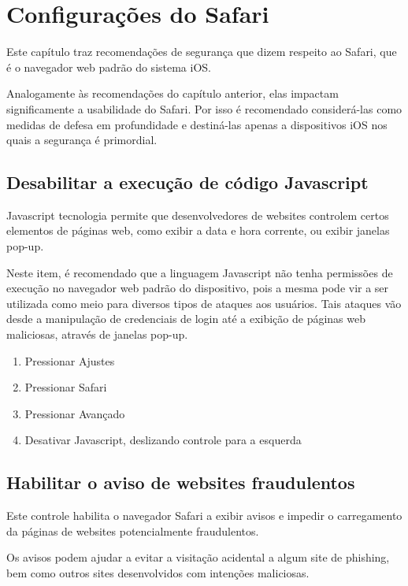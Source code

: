 \chapter{Configura\c c\~oes do Safari}

Este cap\'itulo traz recomenda\c c\~oes de seguran\c ca que dizem respeito ao Safari, que \'e o navegador web padr\~ao do sistema iOS. 

Analogamente \`as recomenda\c c\~oes do cap\'itulo anterior, elas impactam significamente a usabilidade do Safari. Por isso \'e recomendado consider\'a-las como medidas de defesa em profundidade e destin\'a-las apenas a dispositivos iOS nos quais a seguran\c ca \'e primordial.

\section{Desabilitar a execu\c c\~ao de c\'odigo Javascript}

Javascript tecnologia permite que desenvolvedores de websites controlem certos elementos de p\'aginas web, como exibir a data e hora corrente, ou exibir janelas pop-up. 

Neste item, \'e recomendado que a linguagem Javascript n\~ao tenha permiss\~oes de execu\c c\~ao no navegador web padr\~ao do dispositivo, pois a mesma pode vir a ser utilizada como meio para diversos tipos de ataques aos usu\'arios. Tais ataques v\~ao desde a manipula\c c\~ao de credenciais de login at\'e a exibi\c c\~ao de p\'aginas web maliciosas, atrav\'es de janelas pop-up.

\begin{enumerate}
\item Pressionar Ajustes
\item Pressionar Safari
\item Pressionar Avan\c cado
\item Desativar Javascript, deslizando  controle para a esquerda
\end{enumerate}

\section{Habilitar o aviso de websites fraudulentos}

Este controle habilita o navegador Safari a exibir avisos e impedir o carregamento da p\'aginas de websites potencialmente fraudulentos.

Os avisos podem ajudar a evitar a visita\c c\~ao acidental a algum site de phishing, bem como outros sites desenvolvidos com inten\c c\~oes maliciosas.

